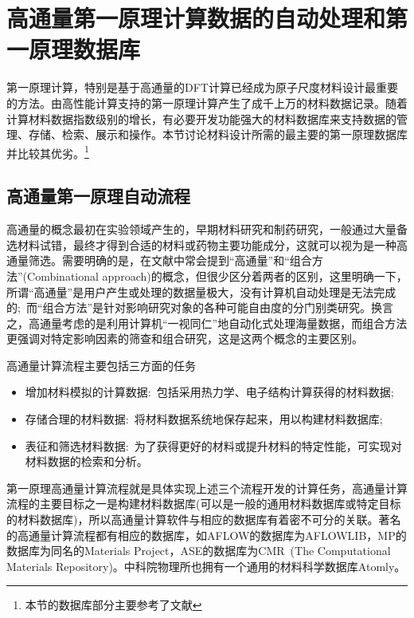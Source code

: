 \chapter{高通量第一原理计算数据的自动处理和第一原理数据库}\label{chap:database} 
第一原理计算，特别是基于高通量的\textrm{DFT}计算已经成为原子尺度材料设计最重要的方法。由高性能计算支持的第一原理计算产生了成千上万的材料数据记录。随着计算材料数据指数级别的增长，有必要开发功能强大的材料数据库来支持数据的管理、存储、检索、展示和操作。本节讨论材料设计所需的最主要的第一原理数据库并比较其优劣。\footnote{本节的数据库部分主要参考了文献}

\section{高通量第一原理自动流程}
高通量的概念最初在实验领域产生的，早期材料研究和制药研究，一般通过大量备选材料试错，最终才得到合适的材料或药物主要功能成分，这就可以视为是一种高通量筛选。需要明确的是，在文献中常会提到“高通量”和“组合方法”(\textrm{Combinational approach})的概念，但很少区分着两者的区别，这里明确一下，所谓“高通量”是用户产生或处理的数据量极大，没有计算机自动处理是无法完成的;~而“组合方法”是针对影响研究对象的各种可能自由度的分门别类研究。换言之，高通量考虑的是利用计算机“一视同仁”地自动化式处理海量数据，而组合方法更强调对特定影响因素的筛查和组合研究，这是这两个概念的主要区别。

高通量计算流程主要包括三方面的任务
\begin{itemize}
	\item 增加材料模拟的计算数据:~包括采用热力学、电子结构计算获得的材料数据;
	\item 存储合理的材料数据:~将材料数据系统地保存起来，用以构建材料数据库;
	\item 表征和筛选材料数据:~为了获得更好的材料或提升材料的特定性能，可实现对材料数据的检索和分析。
\end{itemize}
第一原理高通量计算流程就是具体实现上述三个流程开发的计算任务，高通量计算流程的主要目标之一是构建材料数据库(可以是一般的通用材料数据库或特定目标的材料数据库)，所以高通量计算软件与相应的数据库有着密不可分的关联。著名的高通量计算流程都有相应的数据库，如\textrm{AFLOW}的数据库为\textrm{AFLOWLIB}\cite{CMS58-227_2012,AFLOWORG_URL}，\textrm{MP}的数据库为同名的\textrm{Materials Project}\cite{CMS50-2295_2011,MP_URL}，\textrm{ASE}的数据库为\textrm{CMR~(The Computational Materials Repository)}\cite{CSE14-51_2012,CMR_URL}。中科院物理所也拥有一个通用的材料科学数据库\textrm{Atomly}\cite{ATOMLY_URL}。

